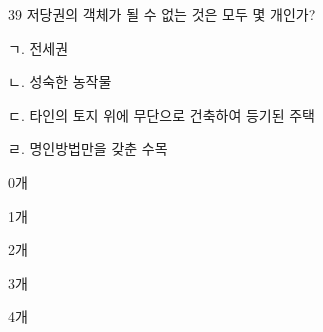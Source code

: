 \begin{question}{39}
저당권의 객체가 될 수 없는 것은 모두 몇 개인가?
\begin{framedtext}
ㄱ. 전세권 \par
ㄴ. 성숙한 농작물 \par
ㄷ. 타인의 토지 위에 무단으로 건축하여 등기된 주택 \par
ㄹ. 명인방법만을 갖춘 수목 \par
\end{framedtext}
\begin{choices}
  \item 0개
  \item 1개
  \item 2개
  \item 3개
  \item 4개
\end{choices}
\end{question}
